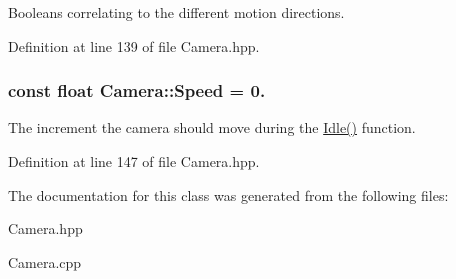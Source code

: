\-Booleans correlating to the different motion directions. 



\-Definition at line 139 of file \-Camera.\-hpp.

\hypertarget{class_camera_aedf8ba8b2af631a5a3e33b19bfa40322}{
\subsubsection[{\-Speed}]{\setlength{\rightskip}{0pt plus 5cm}const float {\bf \-Camera\-::\-Speed} = 0.}}\label{class_camera_aedf8ba8b2af631a5a3e33b19bfa40322}


\-The increment the camera should move during the \hyperlink{class_camera_aec3559fe43597656629fdb00157d3c73}{\-Idle()} function. 



\-Definition at line 147 of file \-Camera.\-hpp.



\-The documentation for this class was generated from the following files\-:\begin{DoxyCompactItemize}
\item 
\-Camera.\-hpp\item 
\-Camera.\-cpp\end{DoxyCompactItemize}
